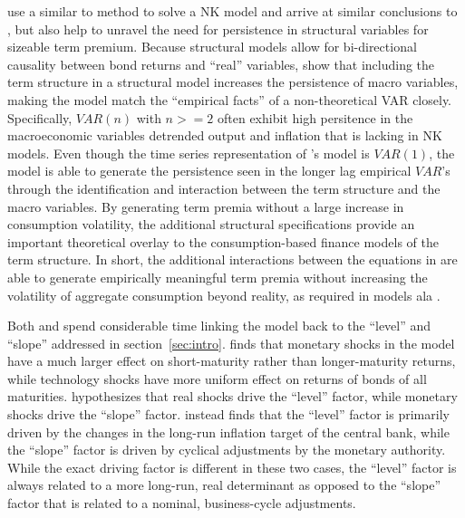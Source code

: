 \documentclass{article}
\numberwithin{equation}{section}
\begin{document}
\citet{bekaertetal2010} use a similar to method to solve a NK model and arrive
at similar conclusions to \citet{wu2006}, but also help to unravel the need for
persistence in structural variables for sizeable term premium. Because
structural models allow for bi-directional causality between bond returns and
``real'' variables, \citeauthor{bekaertetal2010} show that including the term
structure in a structural model increases the persistence of macro variables,
making the model match the ``empirical facts'' of a non-theoretical VAR
closely. Specifically, $VAR(n)$ with $n>=2$ often exhibit high persitence in
the macroeconomic variables detrended output and inflation that is lacking in
NK models. Even though the time series representation of
\citeauthor{bekaertetal2010}'s model is $VAR(1)$, the model is able to generate
the persistence seen in the longer lag empirical $VAR$'s through the
identification and interaction between the term structure and the macro
variables. By generating term premia without a large increase in consumption
volatility, the additional structural specifications provide an important
theoretical overlay to the consumption-based finance models of the term
structure. In short, the additional interactions between the equations in
\citet{bekaertetal2010} are able to generate empirically meaningful term premia
without increasing the volatility of aggregate consumption beyond reality, as
required in models ala \citet{donaldsonetal1990}.

Both \citet{wu2006} and \citet{bekaertetal2010} spend considerable time linking
the model back to the ``level'' and ``slope'' addressed in
section~\ref{sec:intro}. \citeauthor{wu2006} finds that monetary shocks in the
model have a much larger effect on short-maturity rather than longer-maturity
returns, while technology shocks have  more uniform effect on returns of bonds
of all maturities. \citeauthor{wu2006} hypothesizes that real shocks drive the
``level'' factor, while monetary shocks drive the ``slope'' factor.
\citet{bekaertetal2010} instead finds that the ``level'' factor is primarily
driven by the changes in the long-run inflation target of the central bank,
while the ``slope'' factor is driven by cyclical adjustments by the monetary
authority. While the exact driving factor is different in these two cases, the
``level'' factor is always related to a more long-run, real determinant as
opposed to the ``slope'' factor that is related to a nominal, business-cycle
adjustments.
\end{document}
